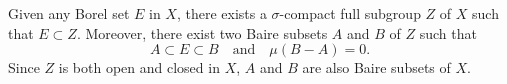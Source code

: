 Given any Borel set $E$ in $X$, there exists a $\sigma$-compact full subgroup $Z$ of $X$ such that $E \subset Z$. Moreover, there exist two Baire subsets $A$ and $B$ of $Z$ such that $$A \subset E \subset B \quad \text{and} \quad \mu(B - A) = 0.$$ Since $Z$ is both open and closed in $X$, $A$ and $B$ are also Baire subsets of $X$.